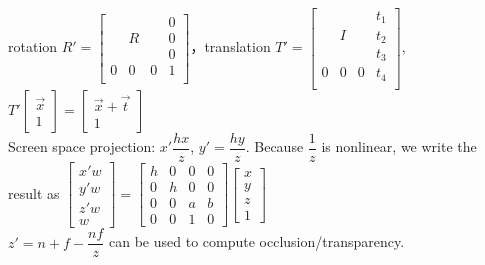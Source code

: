 \documentclass[12pt]{article}
\begin{document}
rotation $R'=\begin{bmatrix}
    {} & {} & {} & 0\\
    {} & R & {} & 0\\
    {} & {} & {} & 0\\
    0 & 0 & 0 & 1\\
\end{bmatrix}$，translation $T'=\begin{bmatrix}
    {} & {} & {} & t_1\\
    {} & I & {} & t_2\\
    {} & {} & {} & t_3\\
    0 & 0 & 0 & t_4\\
\end{bmatrix}$, $T'\begin{bmatrix}
    \vec{x} \\ 1
\end{bmatrix}=\begin{bmatrix}
    \vec{x}+\vec{t} \\ 1
\end{bmatrix}$\\
Screen space projection: $x'\dfrac{hx}{z}$, $y'=\dfrac{hy}{z}$. Because $\dfrac{1}{z}$ is nonlinear,
we write the result as $\begin{bmatrix}
    x'w\\ y'w\\ z'w\\ w
\end{bmatrix}=\begin{bmatrix}
    h & 0 & 0 & 0\\
    0 & h & 0 & 0\\
    0 & 0 & a & b\\
    0 & 0 & 1 & 0
\end{bmatrix}\begin{bmatrix}
    x\\ y\\ z\\ 1
\end{bmatrix}$\\
$z'=n+f-\dfrac{nf}{z}$ can be used to compute occlusion/transparency.
\end{document}
